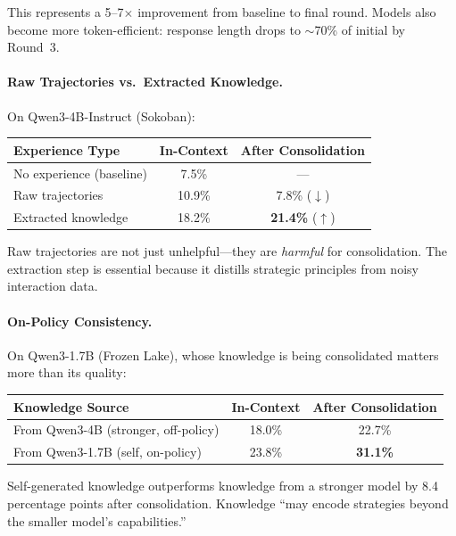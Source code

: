 \documentclass[11pt]{article}
\begin{document}
This represents a 5--7$\times$ improvement from baseline to final round. Models also become more token-efficient: response length drops to $\sim$70\% of initial by Round~3.

\paragraph{Raw Trajectories vs.\ Extracted Knowledge.}
On Qwen3-4B-Instruct (Sokoban):

\begin{center}
\begin{tabular}{lcc}
\toprule
\textbf{Experience Type} & \textbf{In-Context} & \textbf{After Consolidation} \\
\midrule
No experience (baseline) & 7.5\% & --- \\
Raw trajectories & 10.9\% & 7.8\% ($\downarrow$) \\
Extracted knowledge & 18.2\% & \textbf{21.4\%} ($\uparrow$) \\
\bottomrule
\end{tabular}
\end{center}

Raw trajectories are not just unhelpful---they are \emph{harmful} for consolidation. The extraction step is essential because it distills strategic principles from noisy interaction data.

\paragraph{On-Policy Consistency.}
On Qwen3-1.7B (Frozen Lake), whose knowledge is being consolidated matters more than its quality:

\begin{center}
\begin{tabular}{lcc}
\toprule
\textbf{Knowledge Source} & \textbf{In-Context} & \textbf{After Consolidation} \\
\midrule
From Qwen3-4B (stronger, off-policy) & 18.0\% & 22.7\% \\
From Qwen3-1.7B (self, on-policy) & 23.8\% & \textbf{31.1\%} \\
\bottomrule
\end{tabular}
\end{center}

Self-generated knowledge outperforms knowledge from a stronger model by 8.4 percentage points after consolidation. Knowledge ``may encode strategies beyond the smaller model's capabilities.''
\end{document}
